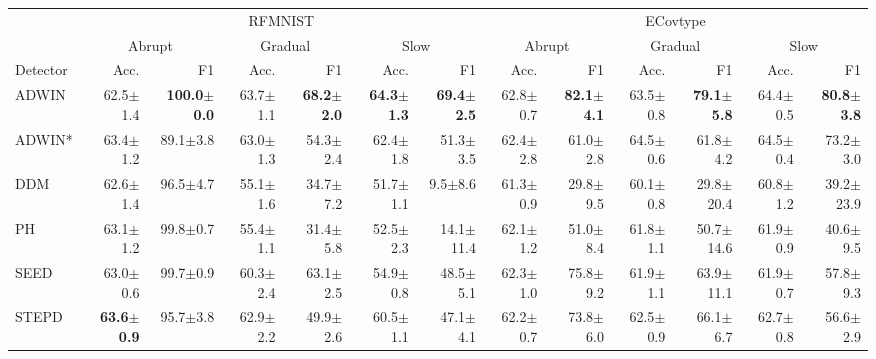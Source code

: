 \begin{tabular}{lrrrrrrrrrrrr}
\toprule
 & \multicolumn{6}{c}{RFMNIST} & \multicolumn{6}{c}{ECovtype} \\
\cmidrule(lr){2-7}\cmidrule(lr){8-13}
 & \multicolumn{2}{c}{Abrupt} & \multicolumn{2}{c}{Gradual} & \multicolumn{2}{c}{Slow} & \multicolumn{2}{c}{Abrupt} & \multicolumn{2}{c}{Gradual} & \multicolumn{2}{c}{Slow} \\
\cmidrule(lr){2-3}\cmidrule(lr){4-5}\cmidrule(lr){6-7}\cmidrule(lr){8-9}\cmidrule(lr){10-11}\cmidrule(lr){12-13}
Detector & Acc. & F1 & Acc. & F1 & Acc. & F1 & Acc. & F1 & Acc. & F1 & Acc. & F1 \\
\midrule
ADWIN & 62.5\tiny{$\pm$1.4} & \textbf{100.0\tiny{$\pm$0.0}} & 63.7\tiny{$\pm$1.1} & \textbf{68.2\tiny{$\pm$2.0}} & \textbf{64.3\tiny{$\pm$1.3}} & \textbf{69.4\tiny{$\pm$2.5}} & 62.8\tiny{$\pm$0.7} & \textbf{82.1\tiny{$\pm$4.1}} & 63.5\tiny{$\pm$0.8} & \textbf{79.1\tiny{$\pm$5.8}} & 64.4\tiny{$\pm$0.5} & \textbf{80.8\tiny{$\pm$3.8}} \\
ADWIN* & 63.4\tiny{$\pm$1.2} & 89.1\tiny{$\pm$3.8} & 63.0\tiny{$\pm$1.3} & 54.3\tiny{$\pm$2.4} & 62.4\tiny{$\pm$1.8} & 51.3\tiny{$\pm$3.5} & 62.4\tiny{$\pm$2.8} & 61.0\tiny{$\pm$2.8} & 64.5\tiny{$\pm$0.6} & 61.8\tiny{$\pm$4.2} & 64.5\tiny{$\pm$0.4} & 73.2\tiny{$\pm$3.0} \\
DDM & 62.6\tiny{$\pm$1.4} & 96.5\tiny{$\pm$4.7} & 55.1\tiny{$\pm$1.6} & 34.7\tiny{$\pm$7.2} & 51.7\tiny{$\pm$1.1} & 9.5\tiny{$\pm$8.6} & 61.3\tiny{$\pm$0.9} & 29.8\tiny{$\pm$9.5} & 60.1\tiny{$\pm$0.8} & 29.8\tiny{$\pm$20.4} & 60.8\tiny{$\pm$1.2} & 39.2\tiny{$\pm$23.9} \\
PH & 63.1\tiny{$\pm$1.2} & 99.8\tiny{$\pm$0.7} & 55.4\tiny{$\pm$1.1} & 31.4\tiny{$\pm$5.8} & 52.5\tiny{$\pm$2.3} & 14.1\tiny{$\pm$11.4} & 62.1\tiny{$\pm$1.2} & 51.0\tiny{$\pm$8.4} & 61.8\tiny{$\pm$1.1} & 50.7\tiny{$\pm$14.6} & 61.9\tiny{$\pm$0.9} & 40.6\tiny{$\pm$9.5} \\
SEED & 63.0\tiny{$\pm$0.6} & 99.7\tiny{$\pm$0.9} & 60.3\tiny{$\pm$2.4} & 63.1\tiny{$\pm$2.5} & 54.9\tiny{$\pm$0.8} & 48.5\tiny{$\pm$5.1} & 62.3\tiny{$\pm$1.0} & 75.8\tiny{$\pm$9.2} & 61.9\tiny{$\pm$1.1} & 63.9\tiny{$\pm$11.1} & 61.9\tiny{$\pm$0.7} & 57.8\tiny{$\pm$9.3} \\
STEPD & \textbf{63.6\tiny{$\pm$0.9}} & 95.7\tiny{$\pm$3.8} & 62.9\tiny{$\pm$2.2} & 49.9\tiny{$\pm$2.6} & 60.5\tiny{$\pm$1.1} & 47.1\tiny{$\pm$4.1} & 62.2\tiny{$\pm$0.7} & 73.8\tiny{$\pm$6.0} & 62.5\tiny{$\pm$0.9} & 66.1\tiny{$\pm$6.7} & 62.7\tiny{$\pm$0.8} & 56.6\tiny{$\pm$2.9} \\

\end{tabular}
